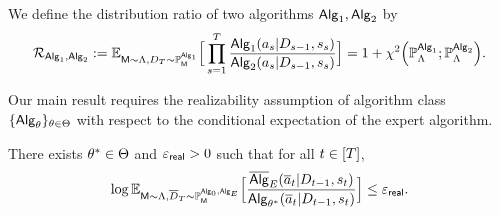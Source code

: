 \begin{definition}\label{def:dist_ratio}
\label{def:distribution-ratio}
We define the distribution ratio of two algorithms ${\mathsf{Alg}}_1,{\mathsf{Alg}}_2$ by
\begin{align*}{\mathcal{R}}_{{\mathsf{Alg}}_1,{\mathsf{Alg}}_2}
:=
\mathbb{E}_{{\mathsf{M}}\sim{\Lambda},{D}_{T}\sim\mathbb{P}_{\mathsf{M}}^{{\mathsf{Alg}}_1}}
\Big[\prod_{s=1}^{{T}}\frac{{\mathsf{Alg}}_1({a}_s|{D}_{s-1},{s}_s)}{{\mathsf{Alg}}_2({a}_s|{D}_{s-1},{s}_s)}\Big] = 1 + \chi^2\Big( \mathbb{P}_{\Lambda}^{{\mathsf{Alg}}_1};\mathbb{P}_{\Lambda}^{{\mathsf{Alg}}_2} \Big).
\end{align*}
\end{definition}


Our main result requires the realizability assumption of algorithm class $\{ {\mathsf{Alg}}_{\theta}\}_{{\theta} \in {\Theta}}$ with respect to the conditional expectation of the expert algorithm. 

\begin{assumption}
\label{asp:realizability}
There exists ${\theta^*}\in{\Theta}$ and ${\varepsilon}_{\sf real} > 0$ such that for all $t\in[{T}]$, 
\begin{align}
\label{eqn:plc_approx_general}
\log\mathbb{E}_{{\mathsf{M}} \sim {\Lambda}, {\overline{D}}_{T} \sim \mathbb{P}_{{\mathsf{M}}}^{{\mathsf{Alg}}_0,{\mathsf{Alg}}_{E}}}\Big[\frac{\overline{\mathsf{Alg}}_{{E}}({\overline{a}}_t|{D}_{t-1},{s}_t )}{{\mathsf{Alg}}_{\theta^*}({\overline{a}}_t|{D}_{t-1},{s}_t )}\Big] \le {\varepsilon}_{\sf real}. 
\end{align}
\end{assumption}


